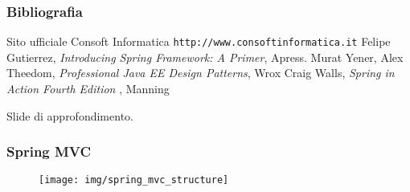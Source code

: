 \documentclass[]{beamer}
\begin{document}
    \begin{frame}
        \frametitle{Bibliografia}
        \begin{thebibliography}{9}
             Sito ufficiale Consoft Informatica 
            \newline
            \texttt{http://www.consoftinformatica.it}
            Felipe Gutierrez, 
            \emph{Introducing Spring Framework: A Primer}, Apress.
            \newline
            Murat Yener, Alex Theedom,
            \emph{Professional Java EE Design Patterns}, Wrox
            \newline
            Craig Walls,
            \emph{Spring in Action Fourth Edition }, Manning
            \newline
        \end{thebibliography}
    \end{frame}

    \begin{frame}
        \begin{center}
            \huge Slide di approfondimento. 
        \end{center}
    \end{frame}


    \begin{frame}
        \frametitle{Spring MVC}
        \begin{figure}[H]
            \centering
            \texttt{[image: img/spring\_mvc\_structure]}\label{spring:diagram}
        \end{figure}
    \end{frame}
\end{document}
